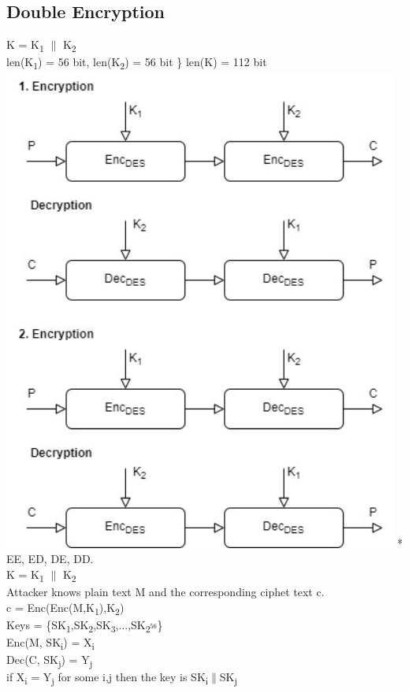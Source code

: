 \documentclass[11pt]{article}
\begin{document}
	\subsection{Double Encryption}
	\flushleft K = K\textsubscript{1} $\|$ K\textsubscript{2}\\
	len({K\textsubscript{1}) = 56 bit, len(K\textsubscript{2})} = 56 bit  \}  len(K) = 112 bit \vspace{0.3cm}\\
	\centering\includegraphics[width=13cm]{Double Enc.jpg}\flushleft
	\mbox{*} EE, ED, DE, DD.\\
	K = K\textsubscript{1} $\|$ K\textsubscript{2}\\
	Attacker knows plain text M and the corresponding ciphet text c.\\
	c = Enc(Enc(M,K\textsubscript{1}),K\textsubscript{2})\\
	Keys = \{SK\textsubscript{1},SK\textsubscript{2},SK\textsubscript{3},...,SK\textsubscript{$2^{56}$}\}\\
	Enc(M, SK\textsubscript{i}) = X\textsubscript{i}\\
	Dec(C, SK\textsubscript{j}) = Y\textsubscript{j}\\
	if X\textsubscript{i} = Y\textsubscript{j} for some i,j then the key is SK\textsubscript{i}$\|$SK\textsubscript{j}\\
\end{document}
